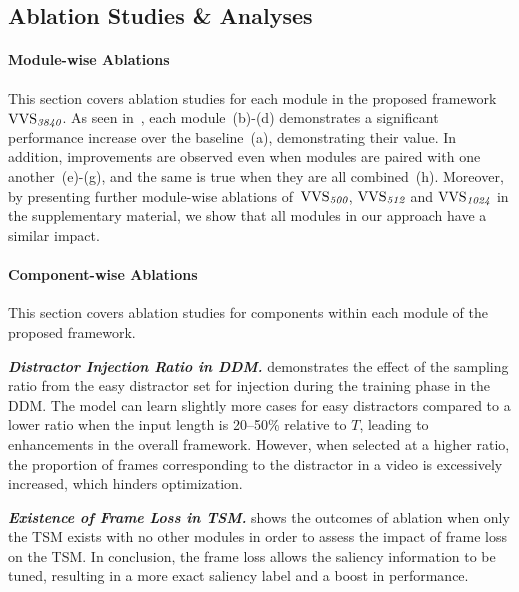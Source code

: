 \documentclass[10pt,twocolumn,letterpaper]{article}
\begin{document}
    \subsection{Ablation Studies \& Analyses}

        \paragraph{Module-wise Ablations \\}
            This section covers ablation studies for each module in the proposed framework~$\textup{VVS}_{\textit{3840}}$. As seen in~, each module~(b)-(d) demonstrates a significant performance increase over the baseline~(a), demonstrating their value. In addition, improvements are observed even when modules are paired with one another~(e)-(g), and the same is true when they are all combined~(h). Moreover, by presenting further module-wise ablations of~$\textup{VVS}_{\textit{500}}$, $\textup{VVS}_{\textit{512}}$ and $\textup{VVS}_{\textit{1024}}$ in the supplementary material, we show that all modules in our approach have a similar impact.
            
            
            \vspace{-4mm}

        \paragraph{Component-wise Ablations \\}

            This section covers ablation studies for components within each module of the proposed framework.
            
            \noindent\textit{\textbf{Distractor Injection Ratio in DDM.}}
             demonstrates the effect of the sampling ratio from the easy distractor set for injection during the training phase in the DDM. The model can learn slightly more cases for easy distractors compared to a lower ratio when the input length is 20–50\% relative to $T$, leading to enhancements in the overall framework. However, when selected at a higher ratio, the proportion of frames corresponding to the distractor in a video is excessively increased, which hinders optimization.

            \noindent\textit{\textbf{Existence of Frame Loss in TSM.}}
             shows the outcomes of ablation when only the TSM exists with no other modules in order to assess the impact of frame loss on the TSM. In conclusion, the frame loss allows the saliency information to be tuned, resulting in a more exact saliency label and a boost in performance.
\end{document}
